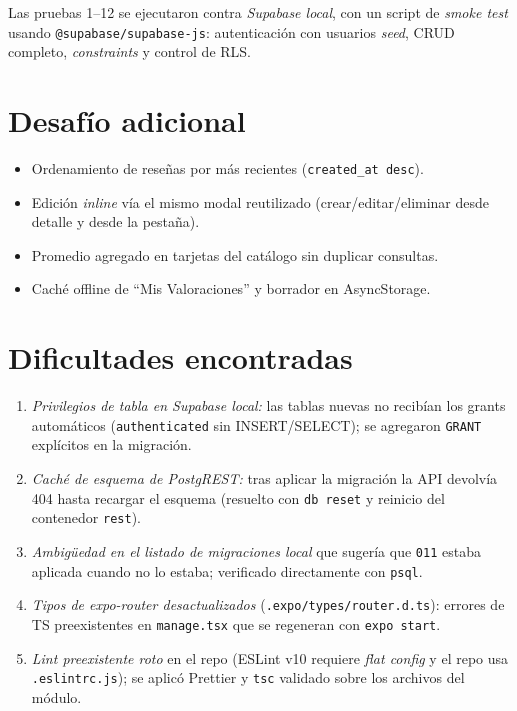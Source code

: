 \documentclass[11pt,a4paper]{article}
\begin{document}
Las pruebas 1--12 se ejecutaron contra \emph{Supabase local}, con un script de
\emph{smoke test} usando \texttt{@supabase/supabase-js}: autenticación con usuarios
\emph{seed}, CRUD completo, \emph{constraints} y control de RLS.

\section{Desafío adicional}
\label{sec:desafio}
\begin{itemize}
  \item Ordenamiento de reseñas por más recientes (\texttt{created\_at desc}).
  \item Edición \emph{inline} vía el mismo modal reutilizado (crear/editar/eliminar desde detalle
        y desde la pestaña).
  \item Promedio agregado en tarjetas del catálogo sin duplicar consultas.
  \item Caché offline de ``Mis Valoraciones'' y borrador en AsyncStorage.
\end{itemize}

\section{Dificultades encontradas}
\label{sec:dificultades}
\begin{enumerate}
  \item \emph{Privilegios de tabla en Supabase local:} las tablas nuevas no recibían los grants
        automáticos (\texttt{authenticated} sin INSERT/SELECT); se agregaron \texttt{GRANT}
        explícitos en la migración.
  \item \emph{Caché de esquema de PostgREST:} tras aplicar la migración la API devolvía 404
        hasta recargar el esquema (resuelto con \texttt{db reset} y reinicio del contenedor
        \texttt{rest}).
  \item \emph{Ambigüedad en el listado de migraciones local} que sugería que \texttt{011} estaba
        aplicada cuando no lo estaba; verificado directamente con \texttt{psql}.
  \item \emph{Tipos de expo-router desactualizados} (\texttt{.expo/types/router.d.ts}):
        errores de TS preexistentes en \texttt{manage.tsx} que se regeneran con \texttt{expo start}.
  \item \emph{Lint preexistente roto} en el repo (ESLint v10 requiere \emph{flat config} y el repo
        usa \texttt{.eslintrc.js}); se aplicó Prettier y \texttt{tsc} validado sobre los archivos
        del módulo.
\end{enumerate}
\end{document}
